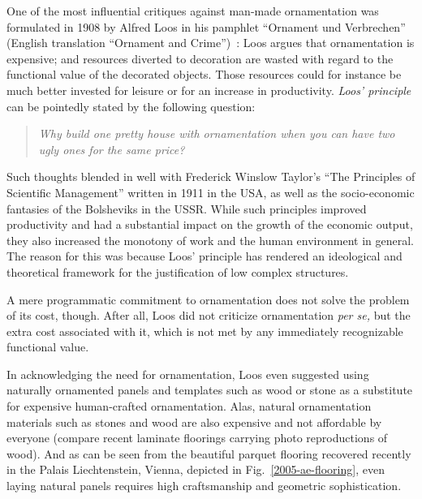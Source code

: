 \documentclass[rmp,amssymb,showpacs,showkeys,12pt,preprint]{revtex4}
\begin{document}
One of the most influential critiques against man-made ornamentation was formulated in
1908 by Alfred Loos in his pamphlet ``Ornament und Verbrechen'' (English translation ``Ornament and Crime'')~\cite{loos}:
Loos argues that ornamentation is expensive; and resources diverted to decoration are wasted with regard to the functional value of the decorated objects.
Those resources could for instance be much better invested for leisure or for an increase in productivity.
{\em Loos' principle} can be pointedly stated by the following
question:
\begin{quote}
{\em
Why build one pretty house with ornamentation when you can have
two ugly ones for the same price?
}
\end{quote}

Such thoughts blended in well with Frederick Winslow Taylor's ``The
Principles of Scientific Management''
\cite{taylor-1911}  written in 1911
in the USA, as well as the socio-economic fantasies of the Bolsheviks in the USSR.
While such principles improved productivity and had a substantial impact on the growth of the economic output, they also increased the monotony of work and the human environment in general.
The reason for this was because Loos' principle has rendered an ideological and theoretical framework for the justification of low complex structures.




A mere programmatic commitment to ornamentation does not solve the problem of its cost, though.
After all, Loos did not criticize ornamentation {\em per se,} but the extra cost associated with it, which is not met by any immediately recognizable functional value.

In acknowledging the need for ornamentation, Loos even suggested using naturally ornamented panels and templates such as wood or stone as a substitute for expensive human-crafted ornamentation.
Alas, natural ornamentation materials such as stones and wood are also expensive and not affordable by everyone (compare recent laminate floorings carrying photo reproductions of wood).
And as can be seen from the beautiful parquet flooring recovered recently in the Palais
Liechtenstein, Vienna, depicted in Fig.~\ref{2005-ae-flooring},
even laying natural panels
requires high craftsmanship and geometric sophistication.
\end{document}
